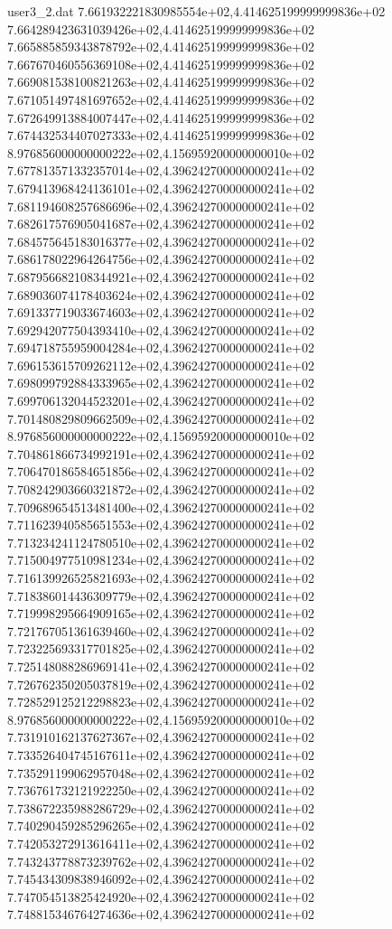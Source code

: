 \begin{filecontents}{user3_2.dat}
7.661932221830985554e+02,4.414625199999999836e+02
7.664289423631039426e+02,4.414625199999999836e+02
7.665885859343878792e+02,4.414625199999999836e+02
7.667670460556369108e+02,4.414625199999999836e+02
7.669081538100821263e+02,4.414625199999999836e+02
7.671051497481697652e+02,4.414625199999999836e+02
7.672649913884007447e+02,4.414625199999999836e+02
7.674432534407027333e+02,4.414625199999999836e+02
8.976856000000000222e+02,4.156959200000000010e+02
7.677813571332357014e+02,4.396242700000000241e+02
7.679413968424136101e+02,4.396242700000000241e+02
7.681194608257686696e+02,4.396242700000000241e+02
7.682617576905041687e+02,4.396242700000000241e+02
7.684575645183016377e+02,4.396242700000000241e+02
7.686178022964264756e+02,4.396242700000000241e+02
7.687956682108344921e+02,4.396242700000000241e+02
7.689036074178403624e+02,4.396242700000000241e+02
7.691337719033674603e+02,4.396242700000000241e+02
7.692942077504393410e+02,4.396242700000000241e+02
7.694718755959004284e+02,4.396242700000000241e+02
7.696153615709262112e+02,4.396242700000000241e+02
7.698099792884333965e+02,4.396242700000000241e+02
7.699706132044523201e+02,4.396242700000000241e+02
7.701480829809662509e+02,4.396242700000000241e+02
8.976856000000000222e+02,4.156959200000000010e+02
7.704861866734992191e+02,4.396242700000000241e+02
7.706470186584651856e+02,4.396242700000000241e+02
7.708242903660321872e+02,4.396242700000000241e+02
7.709689654513481400e+02,4.396242700000000241e+02
7.711623940585651553e+02,4.396242700000000241e+02
7.713234241124780510e+02,4.396242700000000241e+02
7.715004977510981234e+02,4.396242700000000241e+02
7.716139926525821693e+02,4.396242700000000241e+02
7.718386014436309779e+02,4.396242700000000241e+02
7.719998295664909165e+02,4.396242700000000241e+02
7.721767051361639460e+02,4.396242700000000241e+02
7.723225693317701825e+02,4.396242700000000241e+02
7.725148088286969141e+02,4.396242700000000241e+02
7.726762350205037819e+02,4.396242700000000241e+02
7.728529125212298823e+02,4.396242700000000241e+02
8.976856000000000222e+02,4.156959200000000010e+02
7.731910162137627367e+02,4.396242700000000241e+02
7.733526404745167611e+02,4.396242700000000241e+02
7.735291199062957048e+02,4.396242700000000241e+02
7.736761732121922250e+02,4.396242700000000241e+02
7.738672235988286729e+02,4.396242700000000241e+02
7.740290459285296265e+02,4.396242700000000241e+02
7.742053272913616411e+02,4.396242700000000241e+02
7.743243778873239762e+02,4.396242700000000241e+02
7.745434309838946092e+02,4.396242700000000241e+02
7.747054513825424920e+02,4.396242700000000241e+02
7.748815346764274636e+02,4.396242700000000241e+02

\end{filecontents}
